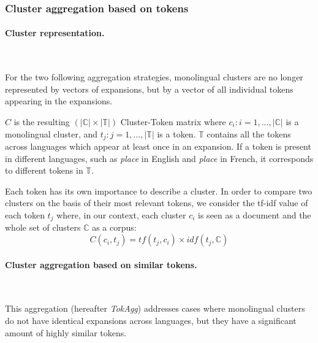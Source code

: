 \documentclass[output=paper]{langsci/langscibook}
\begin{document}
\subsubsection{Cluster aggregation based on tokens}

\paragraph*{Cluster representation.}~\\
\label{cluster representation}

For the two following aggregation strategies, monolingual clusters are
no lon\-ger represented by vectors of expansions, but by a vector of all
individual tokens appearing in the expansions.

$C$ is the resulting $(|\mathbb{C}| \times |\mathbb{T}|)$
Cluster-Token matrix where $c_i : i = 1,...,|\mathbb{C}|$ is a
monolingual cluster, and $t_j : j = 1,...,|\mathbb{T}|$ is a
token. $\mathbb{T}$ contains all the tokens across languages which
appear at least once in an expansion.  If a token is present in
different languages, such as \textit{place} in English and
\textit{place} in French, it corresponds to different tokens in
$\mathbb{T}$.

Each token has its own importance to describe a cluster. In order to
compare two clusters on the basis of their most relevant tokens, we
consider the tf-idf value of each token $t_j$ where, in our context,
each cluster $c_i$ is seen as a document and the whole set of clusters
$\mathbb{C}$ as a corpus:
\begin{equation}\label{eq:tfidf}
C(c_i,t_j) = tf(t_j,c_i) \times idf(t_j,\mathbb{C})
\end{equation}

\paragraph*{Cluster aggregation based on similar tokens.}~\\
\label{similar}

This aggregation (hereafter \textit{TokAgg}) addresses cases where 
monolingual clusters do not have identical expansions across languages, but they 
have a significant amount of highly similar tokens.
\end{document}

